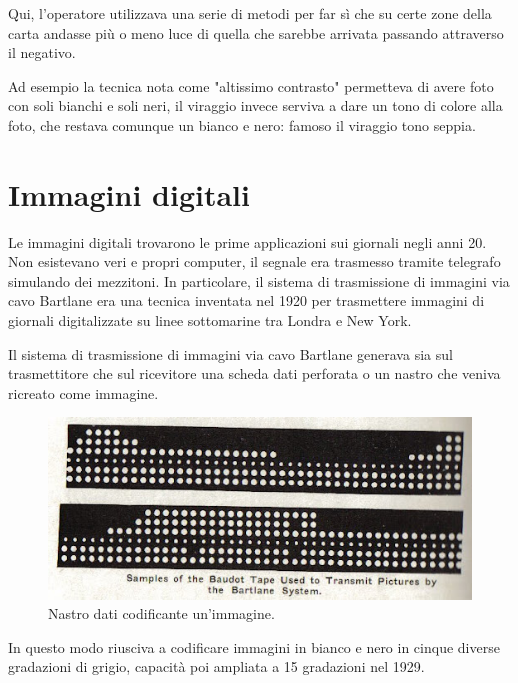 \vspace{1em}\noindent 
Qui, %
l'operatore utilizzava una serie di metodi per far sì che su certe zone della carta andasse più o meno luce di quella che sarebbe arrivata passando attraverso il negativo.

Ad esempio la tecnica nota come "altissimo contrasto" permetteva di avere foto con soli bianchi e soli neri, il viraggio invece serviva a dare un tono di colore alla foto, che restava comunque un bianco e nero: famoso il viraggio tono seppia.

\section{Immagini digitali}
Le immagini digitali trovarono le prime applicazioni sui giornali negli anni 20. Non esistevano veri e propri computer, il segnale era trasmesso tramite telegrafo simulando dei mezzitoni.
In particolare, il sistema di trasmissione di immagini via cavo Bartlane era una tecnica inventata nel 1920 per trasmettere immagini di giornali digitalizzate su linee sottomarine tra Londra e New York.




\noindent Il sistema di trasmissione di immagini via cavo Bartlane generava sia sul trasmettitore che sul ricevitore una scheda dati perforata o un nastro che veniva ricreato come immagine.

\begin{figure}[htb] \centering
\includegraphics[scale=0.7, trim = 0 1.1cm 0 0, clip]{Pictures/nastro Bartlane.jpg}
\caption{Nastro dati codificante un'immagine.}\label{fig:figura}
\end{figure}

\noindent
In questo modo riusciva a codificare immagini in bianco e nero in cinque diverse gradazioni di grigio, capacità poi ampliata a 15 gradazioni nel 1929.

